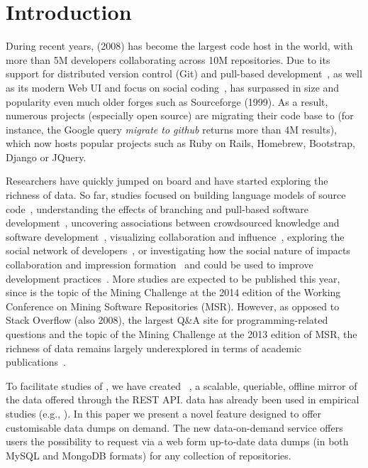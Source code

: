
\section{Introduction}
\label{sec:intro}

During recent years, \gh (2008) has become the largest code host in the world, with more than 5M developers
collaborating across 10M repositories.
Due to its support for distributed version control (Git) and pull-based development~\cite{barr2012cohesive}, 
as well as its modern Web UI and focus on social coding~\cite{dabbish2012social}, \gh has surpassed in size
and popularity even much older forges such as Sourceforge (1999).
As a result, numerous projects (especially open source) are migrating their code base to \gh (for instance, 
the Google query \emph{migrate to github} returns more than 4M results), which now hosts popular projects
such as Ruby on Rails, Homebrew, Bootstrap, Django or JQuery.

Researchers have quickly jumped on board and have started exploring the richness of \gh data.
So far, studies focused on 
building language models of source code~\cite{allamanis2013mining}, 
understanding the effects of branching and pull-based software development~\cite{lee2013git, gousios2014exploratory}, 
uncovering associations between crowdsourced knowledge and software development~\cite{vasilescu2013stackoverflow},
visualizing collaboration and influence~\cite{heller2011visualizing}, 
exploring the social network of developers~\cite{thung2013network, schall2013follow, jiang2013understanding},
or investigating how the social nature of \gh impacts collaboration and impression formation~\cite{dabbish2012social, marlow2013impression}
and could be used to improve development practices~\cite{pham2013creating, pham2013building}.
More studies are expected to be published this year, since \gh is the topic of the Mining Challenge
at the 2014 edition of the Working Conference on Mining Software Repositories (MSR).
However, as opposed to Stack Overflow (also 2008), the largest Q\&A site for programming-related questions
and the topic of the Mining Challenge at the 2013 edition of MSR, the richness of \gh data remains
largely underexplored in terms of academic publications~\cite{vasilescu2012meta}.

To facilitate studies of \gh, we have created \ght~\cite{gousios2012ghtorrent, gousios2013ghtorent}, a scalable, 
queriable, offline mirror of the data offered through the \gh REST API.
\ght data has already been used in empirical studies (e.g., \cite{gousios2014exploratory, squire2014forge, 
vasilescu2013stackoverflow}).
In this paper we present a novel feature designed to offer customisable data dumps on demand.
The new \ght data-on-demand service offers users the possibility to request via a web form up-to-date \ght 
data dumps (in both MySQL and MongoDB formats) for any collection of \gh repositories.


